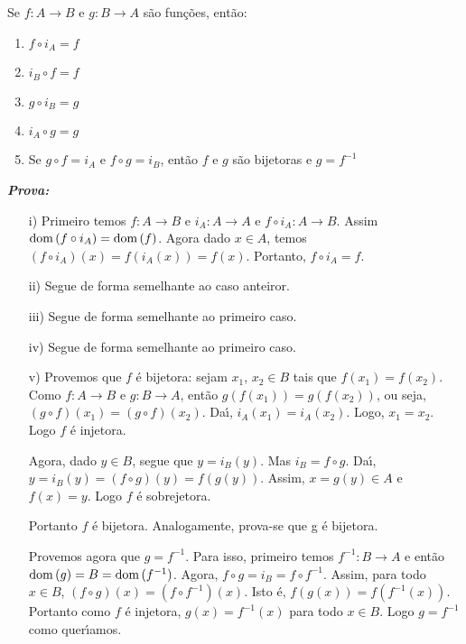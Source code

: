 \documentclass{beamer}
\begin{document}
    \begin{frame}

\begin{proposicao}\label{propriedades_identidade}
    Se $f : A \to B$ e $g : B \to A$ s{\~a}o fun{\c c}{\~o}es, ent{\~a}o:
    \begin{enumerate}[label={\roman*})]
        \item $f\circ i_{A} = f$
        \item $i_{B}\circ f = f$
        \item $g\circ i_{B} = g$
        \item $i_{A}\circ g = g$
        \item Se $g\circ f = i_{A}$ e $f\circ g = i_{B}$, ent{\~a}o $f$ e $g$ s{\~a}o bijetoras e $g=f^{-1}$
    \end{enumerate}
\end{proposicao}
    \noindent \textbf{\textit{Prova:}}
    \begin{enumerate}
        \item[i)] Primeiro temos $f: A \to B$ e $i_{A} : A \to A$ e $f\circ i_{A} : A \to B$. Assim ${\rm dom\,}(f\circ i_{A}) = {\rm dom\,}(f)$. Agora dado $x \in A$, temos $(f\circ i_{A})(x) = f(i_{A}(x)) = f(x)$. Portanto, $f\circ i_{A} = f$.
        \item[ii)] Segue de forma semelhante ao caso anteiror.
        \item[iii)] Segue de forma semelhante ao primeiro caso.
        \item[iv)] Segue de forma semelhante ao primeiro caso.
    \end{enumerate}

    \end{frame}

    \begin{frame}
        \begin{enumerate}
        \item[v)] Provemos que $f$ \'e bijetora: sejam $x_1$, $x_2 \in B$ tais que $f(x_1) = f(x_2)$. Como $f : A \to B$ e $g : B \to A$, ent{\~a}o $g(f(x_1)) = g(f(x_2))$, ou seja, $(g\circ f)(x_1) = (g\circ f)(x_2)$. Da{\'\i}, $i_{A}(x_1) = i_{A}(x_2)$. Logo, $x_1 = x_2$. Logo $f$ {\'e} injetora.

        Agora, dado $y \in B$, segue que $y = i_{B}(y)$. Mas $i_{B} = f\circ g$. Da{\'\i}, $y = i_{B}(y) = (f\circ g)(y) = f(g(y))$. Assim, $x = g(y)\in A$ e $f(x) = y$. Logo $f$ {\'e} sobrejetora.

        Portanto $f$ {\'e} bijetora. Analogamente, prova-se que g {\'e} bijetora. 

        Provemos agora que $g = f^{-1}$. Para isso, primeiro temos  $f^{-1} : B \to A$ e ent\~ao ${\rm dom\,}(g) = B = {\rm dom\,}(f^{-1})$. Agora, $f\circ g = i_{B} = f\circ f^{-1}$. Assim, para todo $x \in B$, $(f\circ g)(x) = (f\circ f^{-1})(x)$. Isto {\'e}, $f(g(x)) = f(f^{-1}(x))$. Portanto como $f$ \'e injetora, $g(x) = f^{-1}(x)$ para todo $x\in B$. Logo $g = f^{-1}$ como quer{\'\i}amos.
    \end{enumerate}

\end{frame}

    \begin{frame}
        \vspace{5cm}
    \end{frame}
\end{document}
